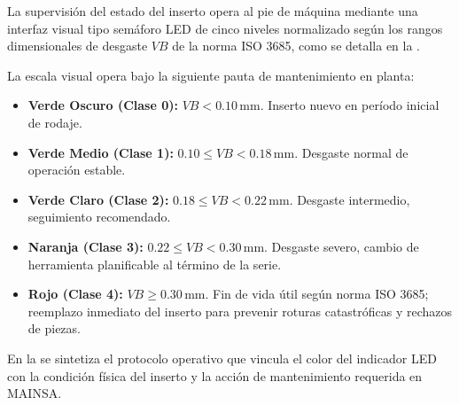 La supervisión del estado del inserto opera al pie de máquina mediante una interfaz visual tipo semáforo LED de cinco niveles normalizado según los rangos dimensionales de desgaste $VB$ de la norma ISO 3685, como se detalla en la .


La escala visual opera bajo la siguiente pauta de mantenimiento en planta:
\begin{itemize}
    \item \textbf{Verde Oscuro (Clase 0):} $VB < 0.10\,\text{mm}$. Inserto nuevo en período inicial de rodaje.
    \item \textbf{Verde Medio (Clase 1):} $0.10 \le VB < 0.18\,\text{mm}$. Desgaste normal de operación estable.
    \item \textbf{Verde Claro (Clase 2):} $0.18 \le VB < 0.22\,\text{mm}$. Desgaste intermedio, seguimiento recomendado.
    \item \textbf{Naranja (Clase 3):} $0.22 \le VB < 0.30\,\text{mm}$. Desgaste severo, cambio de herramienta planificable al término de la serie.
    \item \textbf{Rojo (Clase 4):} $VB \ge 0.30\,\text{mm}$. Fin de vida útil según norma ISO 3685; reemplazo inmediato del inserto para prevenir roturas catastróficas y rechazos de piezas.
\end{itemize}

En la  se sintetiza el protocolo operativo que vincula el color del indicador LED con la condición física del inserto y la acción de mantenimiento requerida en MAINSA.


